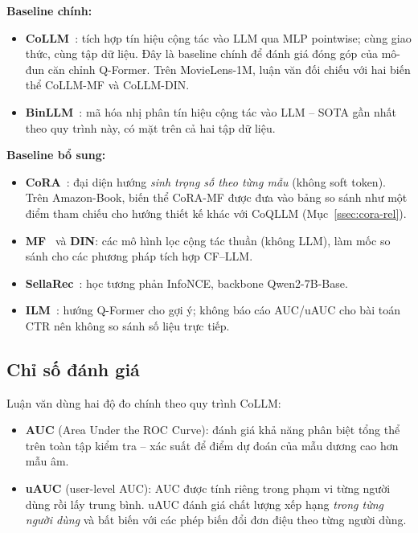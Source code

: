 \textbf{Baseline chính:}
\begin{itemize}
    \item \textbf{CoLLM}~\cite{collm2023}: tích hợp tín hiệu cộng tác vào LLM qua MLP pointwise; cùng giao
    thức, cùng tập dữ liệu. Đây là baseline chính để đánh giá đóng góp của mô-đun căn chỉnh
    Q-Former. Trên MovieLens-1M, luận văn đối chiếu với hai biến thể CoLLM-MF và CoLLM-DIN.
    \item \textbf{BinLLM}~\cite{binllm2024}: mã hóa nhị phân tín hiệu cộng tác vào LLM -- SOTA gần nhất
    theo quy trình này, có mặt trên cả hai tập dữ liệu.
\end{itemize}

\textbf{Baseline bổ sung:}
\begin{itemize}
    \item \textbf{CoRA}~\cite{cora2024}: đại diện hướng \textit{sinh trọng số theo từng mẫu} (không soft
    token). Trên Amazon-Book, biến thể CoRA-MF được đưa vào bảng so sánh như một điểm tham
    chiếu cho hướng thiết kế khác với CoQLLM (Mục~\ref{ssec:cora-rel}).
    \item \textbf{MF}~\cite{mf2009} và \textbf{DIN}: các mô hình lọc cộng tác thuần (không LLM),
    làm mốc so sánh cho các phương pháp tích hợp CF--LLM.
    \item \textbf{SellaRec}~\cite{sellarec2024}: học tương phản InfoNCE, backbone Qwen2-7B-Base.
    \item \textbf{ILM}~\cite{ilm2024}: hướng Q-Former cho gợi ý; không báo cáo AUC/uAUC cho bài
    toán CTR nên không so sánh số liệu trực tiếp.
\end{itemize}

\subsection{Chỉ số đánh giá}
\label{ssec:do-do}

Luận văn dùng hai độ đo chính theo quy trình CoLLM:

\begin{itemize}
    \item \textbf{AUC} (Area Under the ROC Curve): đánh giá khả năng phân biệt tổng thể
    trên toàn tập kiểm tra -- xác suất để điểm dự đoán của mẫu dương cao hơn mẫu âm.

    \item \textbf{uAUC} (user-level AUC): AUC được tính riêng trong phạm vi từng người
    dùng rồi lấy trung bình. uAUC đánh giá chất lượng xếp hạng \textit{trong từng người dùng}
    và bất biến với các phép biến đổi đơn điệu theo từng người dùng.
\end{itemize}

